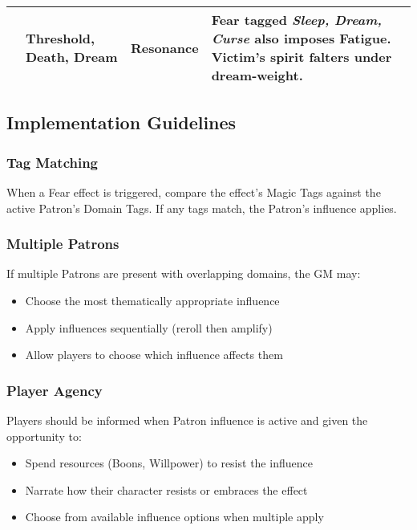 \begin{longtable}{@{}p{3.3cm}p{3.3cm}p{4.6cm}p{7.2cm}@{}}
\begin{longtable}{@{}p{3.2cm}p{4.5cm}p{2.8cm}p{5.9cm}@{}}
Obishaal, Keeper of Threshold Dreams & Threshold, Death, Dream & Resonance & 
Fear tagged \emph{Sleep, Dream, Curse} also imposes Fatigue. Victim’s spirit falters under dream-weight. \\


\bottomrule
\end{longtable}

\subsection{Implementation Guidelines}
\label{subsec:patron-fear-guidelines}

\subsubsection{Tag Matching}
When a Fear effect is triggered, compare the effect's Magic Tags against the active Patron's Domain Tags. If any tags match, the Patron's influence applies.

\subsubsection{Multiple Patrons}
If multiple Patrons are present with overlapping domains, the GM may:
\begin{itemize}
  \item Choose the most thematically appropriate influence
  \item Apply influences sequentially (reroll then amplify)
  \item Allow players to choose which influence affects them
\end{itemize}

\subsubsection{Player Agency}
Players should be informed when Patron influence is active and given the opportunity to:
\begin{itemize}
  \item Spend resources (Boons, Willpower) to resist the influence
  \item Narrate how their character resists or embraces the effect
  \item Choose from available influence options when multiple apply
\end{itemize}
